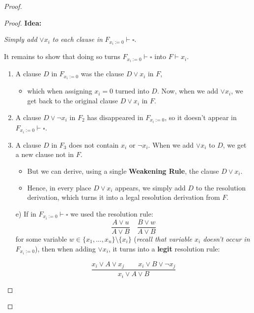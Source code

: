 \begin{proof}
\begin{proof}
\textbf{Idea:}

\begin{center}
\textit{Simply add} $ \lor x_i$ \textit{to each clause in} $F_{x_i := 0} \vdash \square$.
\end{center}
 

It remains to show that doing so turns  
$F_{x_i := 0} \vdash \square$ into $F \vdash x_i$.

\begin{enumerate}
    \item A clause $D$ in $F_{x_i := 0}$ was the clause $D \lor x_i$ in $F$,
    
    \begin{itemize}
        \item which when assigning $x_i = 0$ turned into $D$. Now, when we add $\lor x_i$, we get back to the original clause $D \lor x_i$ in $F$.
    \end{itemize}

    \item A clause $D \lor \neg x_i$ in $F_2$ has disappeared in $F_{x_i := 0}$, so it doesn’t appear in $F_{x_i := 0} \vdash \square$.

    \item A clause $D$ in $F_3$ does not contain $x_i$ or $\neg x_i$. When we add $\lor x_i$ to $D$, we get a new clause not in $F$.
    
    \begin{itemize}
        \item But we can derive, using a single \textbf{Weakening Rule}, the clause $D \lor x_i$.  
        \item Hence, in every place $D \lor x_i$ appears, we simply add $D$ to the resolution derivation, which turns it into a legal resolution derivation from $F$.
    \end{itemize}
\end{enumerate}

 

\begin{enumerate}
    \item[e)] If in $F_{x_i := 0} \vdash \square$ we used the resolution rule:
    \[
    \frac{A \lor u}{A \lor B} \quad \frac{B \lor w}{A \lor B}
    \]
    for some variable $w \in \{x_1, \dots, x_n\} \setminus \{x_i\}$  
    (\textit{recall that variable $x_i$ doesn't occur in} $F_{x_i := 0}$),  
    then when adding $\lor x_i$, it turns into a \textbf{legit} resolution rule:

    \[
    \frac{
    x_i \lor A \lor x_j \qquad x_i \lor B \lor \neg x_j}{    x_i \lor A \lor B
 }   \]


\end{enumerate}
\end{proof}
\end{proof}
